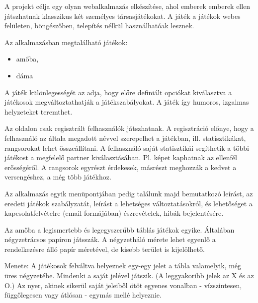



A projekt célja egy olyan webalkalmazás elkészítése, ahol emberek emberek ellen játszhatnak klasszikus két személyes társasjátékokat. A játék a játékok webes felületen, böngészőben, telepítés nélkül használhatóak lesznek.

Az alkalmazásban megtalálható játékok:
\begin{itemize}
	\item amőba,
	\item dáma
\end{itemize}

A játék különlegességét az adja, hogy előre definiált opciókat kiválasztva a játékosok megváltoztathatják a játékszabályokat. A játék így humoros, izgalmas helyzeteket teremthet.

Az oldalon csak regisztrált felhasználók játszhatnak. A regisztráció előnye, hogy a felhasználó az általa megadott névvel szerepelhet a játékban, ill. statisztikákat, rangsorokat lehet összeállítani. A felhasználó saját statisztikái segíthetik a többi játékost a megfelelő partner kiválasztásában. Pl. képet kaphatnak az ellenfél erősségéről. A rangsorok egyrészt érdekesek, másrészt meghozzák a kedvet a versengéshez, a még több játékhoz.

Az alkalmazás egyik menüpontjában pedig találunk majd bemutatkozó leírást, az eredeti játékok szabályzatát, leírást a lehetséges változtatásokról, és lehetőséget a kapcsolatfelvételre (email formájában) észrevételek, hibák bejelentésére. 


Az amőba a legismertebb és legegyszerűbb táblás játékok egyike. Általában négyzetrácsos papíron játsszák. A négyzetháló mérete lehet egyenlő a rendelkezésre álló papír méretével, de kisebb terület is kijelölhető.

Menete: A játékosok felváltva helyeznek egy-egy jelet a tábla valamelyik, még üres négyzetébe. Mindenki a saját jelével játszik. (A leggyakoribb jelek az X és az O.) Az nyer, akinek sikerül saját jeleiből ötöt egyenes vonalban - vízszintesen, függőlegesen vagy átlósan - egymás mellé helyeznie.


